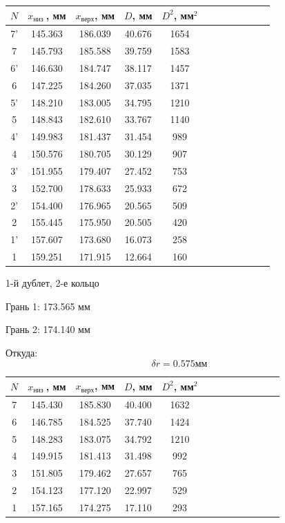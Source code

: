 \documentclass[14pt]{article}
\begin{document}
\begin{center}
\begin{tabular}{|c|c|c|c|c|c|c|c|c|c|c|c|}
\hline
$N$	&	$x_\text{низ }$, мм		&	$x_\text{верх}$, мм		&	$D$, мм		&	$D^2$, мм$^2$	\\
\hline
7'	&	145.363					&	186.039					&	40.676		&	1654			\\
\hline
7	&	145.793					&	185.588					&	39.759		&	1583			\\
\hline
6'	&	146.630					&	184.747					&	38.117		&	1457			\\
\hline
6	&	147.225					&	184.260					&	37.035		&	1371			\\
\hline
5'	&	148.210					&	183.005					&	34.795		&	1210			\\
\hline
5	&	148.843					&	182.610					&	33.767		&	1140			\\
\hline
4'	&	149.983					&	181.437					&	31.454		&	989 			\\
\hline
4	&	150.576					&	180.705					&	30.129		&	907 			\\
\hline
3'	&	151.955					&	179.407					&	27.452		&	753 			\\
\hline
3	&	152.700					&	178.633					&	25.933		&	672 			\\
\hline
2'	&	154.400					&	176.965					&	20.565		&	509				\\
\hline
2	&	155.445					&	175.950					&	20.505		&	420 			\\
\hline
1'	&	157.607					&	173.680					&	16.073		&	258 			\\
\hline
1	&	159.251					&	171.915					&	12.664		&	160 			\\
\hline
\end{tabular}
\end{center}

\vspace{0.5cm}
1-й дублет, 2-е кольцо

Грань 1: 173.565 мм

Грань 2: 174.140 мм

Откуда:
$$
	\delta r = 0.575 \text{мм}
$$

\vspace{1cm}
\begin{center}
\begin{tabular}{|c|c|c|c|c|c|c|c|c|c|c|c|c|}
\hline
$N$	&	$x_\text{низ }$, мм		&	$x_\text{верх}$, мм		&	$D$, мм		&	$D^2$, мм$^2$	\\
\hline
7	&	145.430					&	185.830					&	40.400		&	1632 			\\
\hline
6	&	146.785					&	184.525					&	37.740		&	1424 			\\
\hline
5	&	148.283					&	183.075					&	34.792		&	1210 			\\
\hline
4	&	149.915					&	181.413					&	31.498		&	992 			\\
\hline
3	&	151.805					&	179.462					&	27.657		&	765 			\\
\hline
2	&	154.123					&	177.120					&	22.997		&	529 			\\
\hline
1	&	157.165					&	174.275					&	17.110		&	293 			\\
\hline
\end{tabular}
\end{center}
\end{document}
